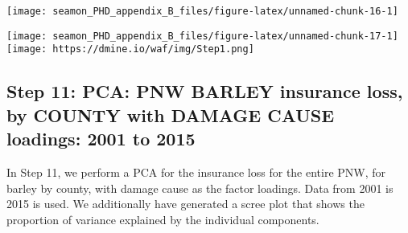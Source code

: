 \documentclass[]{article}
\newenvironment{Shaded}{\begin{snugshade}}{\end{snugshade}}
\newcommand{\CommentTok}[1]{\textcolor[rgb]{0.56,0.35,0.01}{\textit{#1}}}
\newcommand{\DataTypeTok}[1]{\textcolor[rgb]{0.13,0.29,0.53}{#1}}
\newcommand{\DecValTok}[1]{\textcolor[rgb]{0.00,0.00,0.81}{#1}}
\newcommand{\KeywordTok}[1]{\textcolor[rgb]{0.13,0.29,0.53}{\textbf{#1}}}
\newcommand{\NormalTok}[1]{#1}
\newcommand{\OperatorTok}[1]{\textcolor[rgb]{0.81,0.36,0.00}{\textbf{#1}}}
\newcommand{\StringTok}[1]{\textcolor[rgb]{0.31,0.60,0.02}{#1}}
\begin{document}
\texttt{[image: seamon\_PHD\_appendix\_B\_files/figure-latex/unnamed-chunk-16-1]}

\begin{Shaded}
\end{Shaded}

\texttt{[image: seamon\_PHD\_appendix\_B\_files/figure-latex/unnamed-chunk-17-1]}
\texttt{[image: https://dmine.io/waf/img/Step1.png]}

\hypertarget{step-11-pca-pnw-barley-insurance-loss-by-county-with-damage-cause-loadings-2001-to-2015}{%
\subsection{Step 11: PCA: PNW BARLEY insurance loss, by COUNTY with
DAMAGE CAUSE loadings: 2001 to
2015}\label{step-11-pca-pnw-barley-insurance-loss-by-county-with-damage-cause-loadings-2001-to-2015}}

In Step 11, we perform a PCA for the insurance loss for the entire PNW,
for barley by county, with damage cause as the factor loadings. Data
from 2001 is 2015 is used. We additionally have generated a scree plot
that shows the proportion of variance explained by the individual
components.
\end{document}
